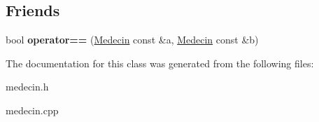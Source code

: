 \subsection*{Friends}
\begin{DoxyCompactItemize}
\item 
\mbox{\label{class_medecin_ab809729def57ace90c0e2cd31232d18c}} 
bool {\bfseries operator==} (\mbox{\hyperlink{class_medecin}{Medecin}} const \&a, \mbox{\hyperlink{class_medecin}{Medecin}} const \&b)
\end{DoxyCompactItemize}


The documentation for this class was generated from the following files\+:\begin{DoxyCompactItemize}
\item 
medecin.\+h\item 
medecin.\+cpp\end{DoxyCompactItemize}
